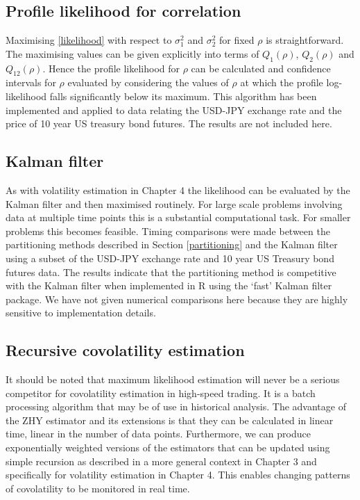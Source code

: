 \subsection{Profile likelihood for correlation}
Maximising  \eqref{likelihood} with respect to $\sigma^2_1$ and $\sigma^2_2$ for fixed $\rho$ is straightforward.  The maximising values can be given explicitly into terms of $Q_1(\rho)$, $Q_2(\rho)$ and $Q_{12}(\rho)$.  Hence the profile likelihood for $\rho$ can be calculated and confidence intervals for $\rho$ evaluated by considering the values of $\rho$ at which the profile log-likelihood falls significantly below its maximum.
This algorithm has been implemented and applied to data relating the USD-JPY exchange rate and the price of 10 year US treasury bond futures.  The results are not included here.
\subsection{Kalman filter}
As with volatility estimation in Chapter 4 the likelihood can be evaluated by the Kalman filter and then maximised routinely. 
 For large scale problems involving data at multiple time points this is a substantial computational task.  For smaller problems this becomes feasible.  Timing comparisons were made between the partitioning methods described in Section \ref{partitioning} and the Kalman filter using a subset of the USD-JPY exchange rate and 10 year US Treasury bond futures data. The results indicate that the partitioning method is competitive with the Kalman filter when implemented in {\sf R} using the `fast' Kalman filter package. We have not given numerical comparisons here because they are highly sensitive to implementation details.  
\subsection{Recursive covolatility estimation}
It should be noted that maximum likelihood estimation will never be a serious competitor for covolatility estimation in high-speed trading. It is a batch processing algorithm that may be of use in historical analysis.  The advantage of the ZHY estimator and its extensions is that they can be calculated in linear time, linear in the number of data points. Furthermore, we can produce exponentially weighted versions of the estimators that can be updated using simple recursion as described in a more general context in Chapter 3 and specifically for volatility estimation in Chapter 4. This enables changing patterns of covolatility to be monitored in real time.
